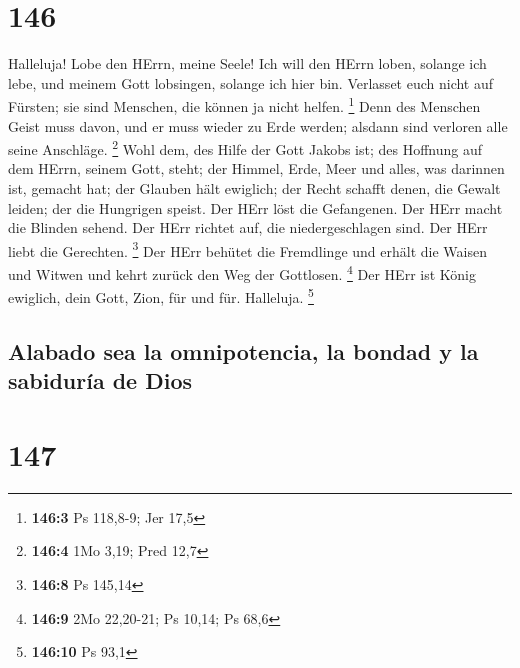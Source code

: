 \hypertarget{section-145}{%
\section{146}\label{section-145}}

 Halleluja! Lobe den HErrn, meine Seele! 
Ich will den HErrn loben, solange ich lebe, und meinem Gott lobsingen,
solange ich hier bin.  Verlasset euch nicht auf Fürsten;
sie sind Menschen, die können ja nicht helfen. \footnote{\textbf{146:3}
  Ps 118,8-9; Jer 17,5}  Denn des Menschen Geist muss
davon, und er muss wieder zu Erde werden; alsdann sind verloren alle
seine Anschläge. \footnote{\textbf{146:4} 1Mo 3,19; Pred 12,7}
 Wohl dem, des Hilfe der Gott Jakobs ist; des Hoffnung auf
dem HErrn, seinem Gott, steht;  der Himmel, Erde, Meer und
alles, was darinnen ist, gemacht hat; der Glauben hält ewiglich;
 der Recht schafft denen, die Gewalt leiden; der die
Hungrigen speist. Der HErr löst die Gefangenen.  Der HErr
macht die Blinden sehend. Der HErr richtet auf, die niedergeschlagen
sind. Der HErr liebt die Gerechten. \footnote{\textbf{146:8} Ps 145,14}
 Der HErr behütet die Fremdlinge und erhält die Waisen und
Witwen und kehrt zurück den Weg der Gottlosen. \footnote{\textbf{146:9}
  2Mo 22,20-21; Ps 10,14; Ps 68,6}  Der HErr ist König
ewiglich, dein Gott, Zion, für und für. Halleluja. \footnote{\textbf{146:10}
  Ps 93,1}

\hypertarget{alabado-sea-la-omnipotencia-la-bondad-y-la-sabiduruxeda-de-dios}{%
\subsection{Alabado sea la omnipotencia, la bondad y la sabiduría de
Dios}\label{alabado-sea-la-omnipotencia-la-bondad-y-la-sabiduruxeda-de-dios}}

\hypertarget{section-146}{%
\section{147}\label{section-146}}


